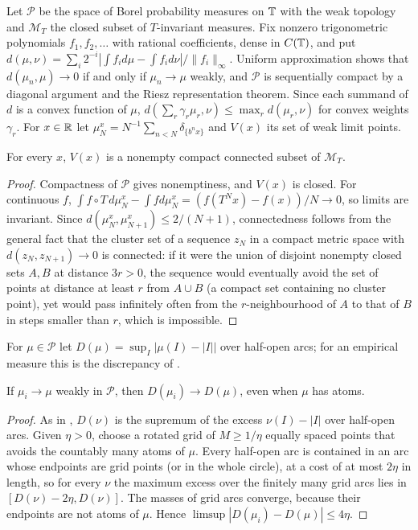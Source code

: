 \documentclass[11pt]{article}
\newcommand{\fr}[1]{\{#1\}}
\newcommand{\Prob}{\mathcal P}
\newcommand{\Minv}{\mathcal M_T}
\begin{document}
Let $\Prob$ be the space of Borel probability measures on $\mathbb T$ with the weak topology and $\Minv$
the closed subset of $T$-invariant measures. Fix nonzero trigonometric polynomials $f_1,f_2,\ldots$
with rational coefficients, dense in $C(\mathbb T)$, and put
$d(\mu,\nu)=\sum_i2^{-i}|\int f_id\mu-\int f_id\nu|/\|f_i\|_\infty$. Uniform approximation shows that
$d(\mu_n,\mu)\to0$ if and only if $\mu_n\to\mu$ weakly, and $\Prob$ is sequentially compact by a
diagonal argument and the Riesz representation theorem. Since each summand of $d$ is a convex
function of $\mu$, $d(\sum_r\gamma_r\mu_r,\nu)\le\max_rd(\mu_r,\nu)$ for convex weights $\gamma_r$. For $x\in\mathbb R$ let
$\mu_N^x=N^{-1}\sum_{n<N}\delta_{\fr{b^nx}}$ and $V(x)$ its set of weak limit points.

\begin{lemma}\label{lem:necessity}
For every $x$, $V(x)$ is a nonempty compact connected subset of $\Minv$.
\end{lemma}

\begin{proof}
Compactness of $\Prob$ gives nonemptiness, and $V(x)$ is closed. For continuous $f$,
$\int f\circ T\,d\mu_N^x-\int fd\mu_N^x=(f(T^Nx)-f(x))/N\to0$, so limits are invariant. Since
$d(\mu_N^x,\mu_{N+1}^x)\le2/(N+1)$, connectedness follows from the general fact that the cluster set
of a sequence $z_N$ in a compact metric space with $d(z_N,z_{N+1})\to0$ is connected: if it were
the union of disjoint nonempty closed sets $A,B$ at distance $3r>0$, the sequence would eventually
avoid the set of points at distance at least $r$ from $A\cup B$ (a compact set containing no
cluster point), yet would pass infinitely often from the $r$-neighbourhood of $A$ to that of $B$ in
steps smaller than $r$, which is impossible.
\end{proof}

For $\mu\in\Prob$ let $D(\mu)=\sup_I|\mu(I)-|I||$ over half-open arcs; for an empirical measure this
is the discrepancy of .

\begin{lemma}\label{lem:Dcont}
If $\mu_i\to\mu$ weakly in $\Prob$, then $D(\mu_i)\to D(\mu)$, even when $\mu$ has atoms.
\end{lemma}

\begin{proof}
As in , $D(\nu)$ is the supremum of the excess $\nu(I)-|I|$ over half-open arcs. Given
$\eta>0$, choose a rotated grid of $M\ge1/\eta$ equally spaced points that avoids the countably many
atoms of $\mu$. Every half-open arc is contained in an arc whose endpoints are grid points (or in the
whole circle), at a cost of at most $2\eta$ in length, so for every $\nu$ the maximum excess over the
finitely many grid arcs lies in $[D(\nu)-2\eta,D(\nu)]$. The masses of grid arcs converge, because
their endpoints are not atoms of $\mu$. Hence $\limsup|D(\mu_i)-D(\mu)|\le4\eta$.
\end{proof}
\end{document}
